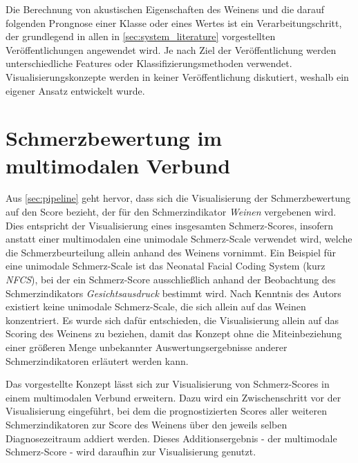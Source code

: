 Die Berechnung von akustischen Eigenschaften des Weinens und die darauf folgenden Prongnose einer Klasse oder eines Wertes ist ein Verarbeitungschritt, der grundlegend in allen in \autoref{sec:system_literature} vorgestellten Veröffentlichungen angewendet wird. Je nach Ziel der Veröffentlichung werden unterschiedliche Features oder Klassifizierungsmethoden verwendet. Visualisierungskonzepte werden in keiner Veröffentlichung diskutiert, weshalb ein eigener Ansatz entwickelt wurde.

\section{Schmerzbewertung im multimodalen Verbund}
\label{sec:multimodal_integration}

Aus \autoref{sec:pipeline} geht hervor, dass sich die Visualisierung der Schmerzbewertung auf den Score bezieht, der für den Schmerzindikator \emph{Weinen} vergebenen wird. Dies entspricht der Visualisierung eines insgesamten Schmerz-Scores, insofern anstatt einer multimodalen eine unimodale Schmerz-Scale verwendet wird, welche die Schmerzbeurteilung allein anhand des Weinens vornimmt. Ein Beispiel für eine unimodale Schmerz-Scale ist das \glqq Neonatal Facial Coding System\grqq{} (kurz \emph{NFCS}), bei der ein Schmerz-Score ausschließlich anhand der Beobachtung des Schmerzindikators \emph{Gesichtsausdruck} bestimmt wird.\cite[S. 70]{PainAssessment02} Nach Kenntnis des Autors existiert keine unimodale Schmerz-Scale, die sich allein auf das Weinen konzentriert. Es wurde sich dafür entschieden, die Visualisierung allein auf das Scoring des Weinens zu beziehen, damit das Konzept ohne die Miteinbeziehung einer größeren Menge unbekannter Auswertungsergebnisse anderer Schmerzindikatoren erläutert werden kann.

Das vorgestellte Konzept lässt sich zur Visualisierung von Schmerz-Scores in einem multimodalen Verbund erweitern. Dazu wird ein Zwischenschritt vor der Visualisierung eingeführt, bei dem die prognostizierten Scores aller weiteren Schmerzindikatoren zur Score des Weinens über den jeweils selben Diagnosezeitraum addiert werden. Dieses Additionsergebnis - der multimodale Schmerz-Score -  wird daraufhin zur Visualisierung genutzt.

